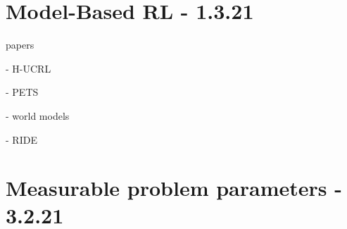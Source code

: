 \documentclass[letterpaper]{article}
\theoremstyle{definition}
\begin{document}
%
%
%


\section{Model-Based RL - 1.3.21} \label{sec:mbrl}

papers

\cite{Curi2020} - H-UCRL

\cite{Chua2018} - PETS

\cite{Ha2018} - world models

\cite{Raileanu2020} - RIDE

\section{Measurable problem parameters - 3.2.21} \label{sec:experiments}
\end{document}
